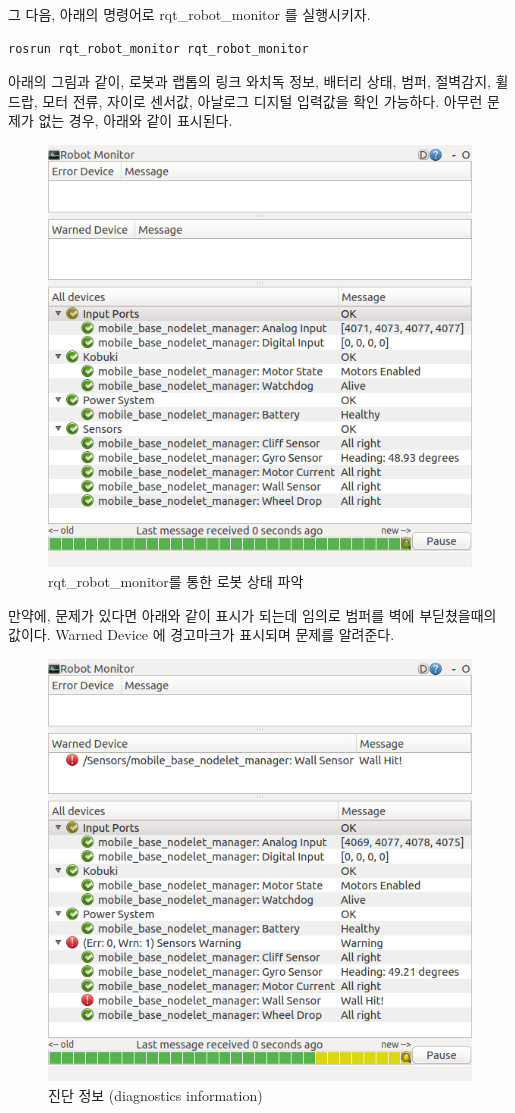 그 다음, 아래의 명령어로 rqt\_robot\_monitor 를 실행시키자.

\vspace{\baselineskip}
\begin{lstlisting}[language=ROS]
rosrun rqt_robot_monitor rqt_robot_monitor
\end{lstlisting}


아래의 그림과 같이, 로봇과 랩톱의 링크 와치독 정보, 배터리 상태, 범퍼, 절벽감지, 휠 드랍, 모터 전류, 자이로 센서값, 아날로그 디지털 입력값을 확인 가능하다. 아무런 문제가 없는 경우, 아래와 같이 표시된다.

\begin{figure}[h]
\centering\includegraphics[width=0.8\columnwidth]{pictures/chapter10/rqt_robot_monitor.png}
\caption{rqt\_robot\_monitor를 통한 로봇 상태 파악}
\end{figure}

만약에, 문제가 있다면 아래와 같이 표시가 되는데 임의로 범퍼를 벽에 부딛쳤을때의 값이다. Warned Device 에 경고마크가 표시되며 문제를 알려준다.

\begin{figure}[h]
\centering\includegraphics[width=0.8\columnwidth]{pictures/chapter10/diagnostics_warning.png}
\caption{진단 정보 (diagnostics information)}
\end{figure}

